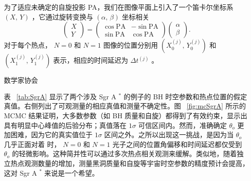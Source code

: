 \documentclass[aps,reprint,superscriptaddress,nofootinbib,floatfix,longbibliography,preprintnumbers]{revtex4-1}
\newcommand{\PA}{\mathrm{PA}}
\begin{document}
为了适应未确定的自旋投影 PA，我们在图像平面上引入了一个笛卡尔坐标系    $(X,\,Y)$   ，它通过旋转变换与    $(\alpha,\,\beta)$    坐标相关
   \begin{equation}
    \begin{pmatrix}
        X  \\  Y
    \end{pmatrix} = \begin{pmatrix}
    \cos\PA & -\sin\PA  \\  
    \sin\PA & \cos\PA
    \end{pmatrix} \begin{pmatrix}
        \alpha  \\  \beta
    \end{pmatrix}.
    \label{eq:XY}
\end{equation}    对于每个热点，   $N=0$    和    $N=1$    图像的位置分别用    $(X_0^{(j)},\,Y_0^{(j)})$    和    $(X_1^{(j)},\,Y_1^{(j)})$    表示，相应的时间延迟为    $\Delta t^{(j)}$   。  

数学家协会  

表~   \ref{tab:SgrA}    显示了两个涉及 Sgr A    $^*$    的例子的 BH 时空参数和热点位置的假定真值。右侧列出了可观测量的相应真值和测量不确定性。图~   \ref{fig:mcSgrA}    所示的 MCMC 结果证明，大多数参数（如 BH 质量和自旋）都得到了有效约束，显示出具有明显中心峰值的后验分布；真值落在    $1\sigma$    可信区间内。然而，准确确定    $\theta_o$    更加困难，因为它的真实值位于    $1\sigma$    区间之外。之所以出现这一挑战，是因为当    $\theta_o$    几乎正面对着    \cite{Gralla:2019drh,Hadar:2020fda}    时，   $N=0$    和    $N=1$    光子之间的位置角偏移和时间延迟都仅受到    $\theta_o$    的轻微影响。这种简并性可以通过多次热点相关观测来缓解。类似地，随着独立热点观测数量的增加，测量黑洞质量和自旋等宇宙时空参数的精度预计会提高，这对 Sgr A    $^*$    来说是一个希望。  
\end{document}
